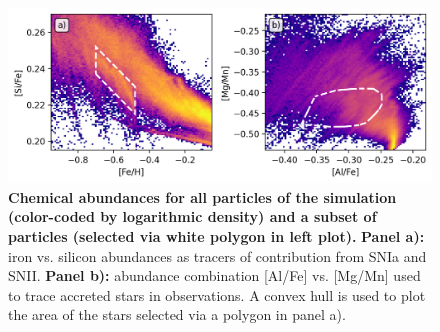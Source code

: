 \documentclass[fleqn,usenatbib]{mnras}
\begin{document}
\begin{figure}
	\includegraphics[width=\textwidth]{figures/low_alpha_halo.png}
    \caption{
    \textbf{Chemical abundances for all particles of the simulation (color-coded by logarithmic density) and a subset of particles (selected via white polygon in left plot).} 
    \textbf{Panel a):} iron vs. silicon abundances as tracers of contribution from SNIa and SNII. \textbf{Panel b):} abundance combination [Al/Fe] vs. [Mg/Mn] used to trace accreted stars in observations. A convex hull is used to plot the area of the stars selected via a polygon in panel a).}
    \label{fig:low_alpha_halo}
\end{figure}


\end{document}
